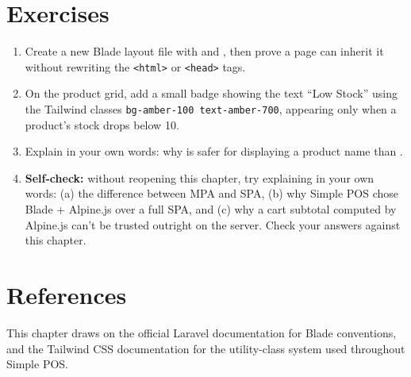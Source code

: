 \section{Exercises}

\begin{enumerate}
  \item Create a new Blade layout file with  and
    , then prove a page can inherit it without
    rewriting the \texttt{<html>} or \texttt{<head>} tags.
  \item On the  product grid, add a small badge showing the
    text ``Low Stock'' using the Tailwind classes \texttt{bg-amber-100
    text-amber-700}, appearing only when a product's stock drops below 10.
  \item Explain in your own words: why is \cmd{\{\{ \}\}} safer for
    displaying a product name than \cmd{\{!! !!\}}.
  \item \textbf{Self-check:} without reopening this chapter, try
    explaining in your own words: (a) the difference between MPA and SPA,
    (b) why Simple POS chose Blade + Alpine.js over a full SPA, and (c)
    why a cart subtotal computed by Alpine.js can't be trusted outright on
    the server. Check your answers against this chapter.
\end{enumerate}

\section{References}

This chapter draws on the official Laravel documentation
\cite{laraveldocs} for Blade conventions, and the Tailwind CSS
documentation \cite{tailwinddocs} for the utility-class system used
throughout Simple POS.
